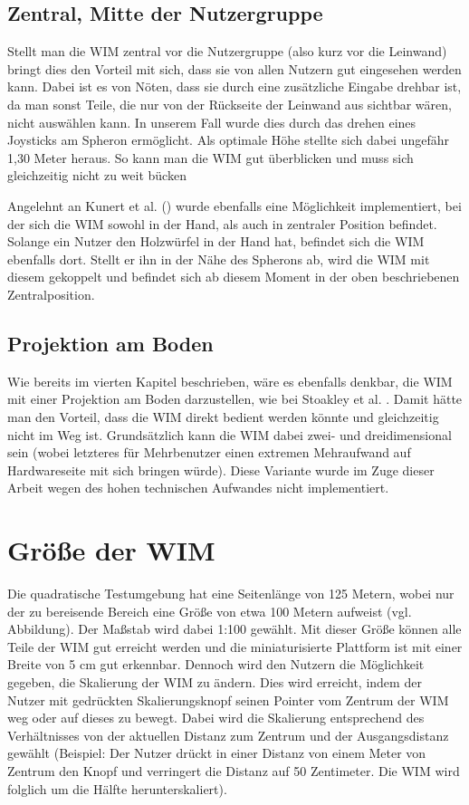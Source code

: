 \subsection{Zentral, Mitte der Nutzergruppe}
Stellt man die WIM zentral vor die Nutzergruppe (also kurz vor die Leinwand) bringt dies den Vorteil mit sich, dass sie von allen Nutzern gut eingesehen werden kann.
Dabei ist es von Nöten, dass sie durch eine zusätzliche Eingabe drehbar ist, da man sonst Teile, die nur von der Rückseite der Leinwand aus sichtbar wären, nicht auswählen kann.
In unserem Fall wurde dies durch das drehen eines Joysticks am Spheron ermöglicht.
Als optimale Höhe stellte sich dabei ungefähr 1,30 Meter heraus. So kann man die WIM gut überblicken und muss sich gleichzeitig nicht zu weit bücken

Angelehnt an Kunert et al. (\cite{Kunert2014Photoportals}) wurde ebenfalls eine Möglichkeit implementiert, bei der sich die WIM sowohl in der Hand, als auch in zentraler Position befindet. Solange ein Nutzer den Holzwürfel in der Hand hat, befindet sich die WIM ebenfalls dort. Stellt er ihn in der Nähe des Spherons ab, wird die WIM mit diesem gekoppelt und befindet sich ab diesem Moment in der oben beschriebenen Zentralposition.

\subsection{Projektion am Boden}
Wie bereits im vierten Kapitel beschrieben, wäre es ebenfalls denkbar, die WIM mit einer Projektion am Boden darzustellen, wie bei Stoakley et al. \cite{Stoakley2010VirtualWIMb}.
Damit hätte man den Vorteil, dass die WIM direkt bedient werden könnte und gleichzeitig nicht im Weg ist. Grundsätzlich kann die WIM dabei zwei- und dreidimensional sein (wobei letzteres für Mehrbenutzer einen extremen Mehraufwand auf Hardwareseite mit sich bringen würde). Diese Variante wurde im Zuge dieser Arbeit wegen des hohen technischen Aufwandes nicht implementiert.

\section{Größe der WIM}
Die quadratische Testumgebung hat eine Seitenlänge von 125 Metern, wobei nur der zu bereisende Bereich eine Größe von etwa 100 Metern aufweist (vgl. Abbildung).
Der Maßstab wird dabei 1:100 gewählt. Mit dieser Größe können alle Teile der WIM gut erreicht werden und die miniaturisierte Plattform ist mit einer Breite von 5 cm gut erkennbar. 
Dennoch wird den Nutzern die Möglichkeit gegeben, die Skalierung der WIM zu ändern. Dies wird erreicht, indem der Nutzer mit gedrückten Skalierungsknopf seinen Pointer vom Zentrum der WIM weg oder auf dieses zu bewegt. Dabei wird die Skalierung entsprechend des Verhältnisses von der aktuellen Distanz zum Zentrum und der Ausgangsdistanz gewählt (Beispiel: Der Nutzer drückt in einer Distanz von einem Meter von Zentrum den Knopf und verringert die Distanz auf 50 Zentimeter. Die WIM wird folglich um die Hälfte herunterskaliert).

